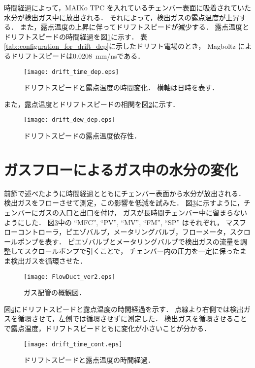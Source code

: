 \documentclass[../master]{subfiles}
\begin{document}
時間経過によって，MAIKo TPC を入れているチェンバー表面に吸着されていた水分が検出ガス中に放出される．
それによって，検出ガスの露点温度が上昇する．
また，露点温度の上昇に伴ってドリフトスピードが減少する．
露点温度とドリフトスピードの時間経過を図\ref{fig::drift_time_dep}に示す．
表\ref{tab::configuration_for_drift_dep}に示したドリフト電場のとき，
Magboltz によるドリフトスピードは\SI{0.0208}{\milli\metre/\nano\second}である．
\begin{figure}
  \centering
  \texttt{[image: drift\_time\_dep.eps]}
  \caption[ドリフトスピードと露点温度の時間変化．]
          {ドリフトスピードと露点温度の時間変化．
          横軸は日時を表す．}
  \label{fig::drift_time_dep}
\end{figure}
また，露点温度とドリフトスピードの相関を図\ref{fig::drift_dew_dep}に示す．
\begin{figure}
  \centering
  \texttt{[image: drift\_dew\_dep.eps]}
  \caption{ドリフトスピードの露点温度依存性．}
  \label{fig::drift_dew_dep}
\end{figure}

\section{ガスフローによるガス中の水分の変化}
前節で述べたように時間経過とともにチェンバー表面から水分が放出される．
検出ガスをフローさせて測定，この影響を低減を試みた．
図\ref{fig::gas_duct}に示すように，チェンバーにガスの入口と出口を付け，
ガスが長時間チェンバー中に留まらないようにした．
図\ref{fig::gas_duct}中の ``MFC'', ``PV'', ``MV'', ``FM'', ``SP'' はそれぞれ，
マスフローコントローラ，ピエゾバルブ，メータリングバルブ，フローメータ，スクロールポンプを表す．
ピエゾバルブとメータリングバルブで検出ガスの流量を調整してスクロールポンプで引くことで，
チェンバー内の圧力を一定に保ったまま検出ガスを循環させた．
\begin{figure}
  \centering
  \texttt{[image: FlowDuct\_ver2.eps]}
  \caption{ガス配管の概観図．}
  \label{fig::gas_duct}
\end{figure}
図\ref{fig::drift_time_cont}にドリフトスピードと露点温度の時間経過を示す．
点線より右側では検出ガスを循環させて，左側では循環させずに測定した．
検出ガスを循環させることで露点温度，ドリフトスピードともに変化が小さいことが分かる．
\begin{figure}
  \centering
  \texttt{[image: drift\_time\_cont.eps]}
  \caption{ドリフトスピードと露点温度の時間経過．}
  \label{fig::drift_time_cont}
\end{figure}
\end{document}
